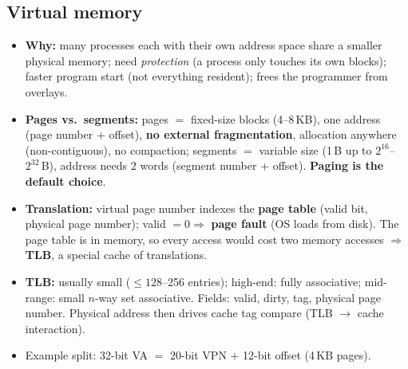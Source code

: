 \subsection{Virtual memory}
\begin{itemize}
\item \textbf{Why:} many processes each with their own address space share a smaller physical memory; need \emph{protection} (a process only touches its own blocks); faster program start (not everything resident); frees the programmer from overlays.
\item \textbf{Pages vs.\ segments:} pages $=$ fixed-size blocks (4--8\,KB), one address (page number $+$ offset), \textbf{no external fragmentation}, allocation anywhere (non-contiguous), no compaction; segments $=$ variable size (1\,B up to $2^{16}$--$2^{32}$\,B), address needs 2 words (segment number + offset). \textbf{Paging is the default choice}.
\item \textbf{Translation:} virtual page number indexes the \textbf{page table} (valid bit, physical page number); valid $=0\Rightarrow$ \textbf{page fault} (OS loads from disk). The page table is in memory, so every access would cost two memory accesses $\Rightarrow$ \textbf{TLB}, a special cache of translations.
\item \textbf{TLB:} usually small ($\le128$--256 entries); high-end: fully associative; mid-range: small $n$-way set associative. Fields: valid, dirty, tag, physical page number. Physical address then drives cache tag compare (TLB $\rightarrow$ cache interaction).
\item Example split: 32-bit VA $=$ 20-bit VPN $+$ 12-bit offset (4\,KB pages).
\end{itemize}

